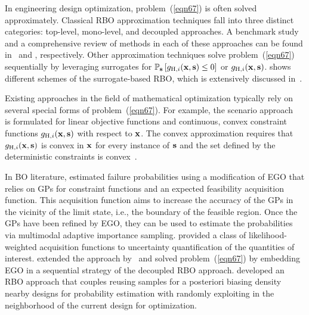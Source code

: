 \documentclass[journal ]{new-aiaa}
\begin{document}
	In engineering design optimization, problem~(\ref{eqn67}) is often solved approximately.
	Classical RBO approximation techniques fall into three distinct categories: top-level, mono-level, and decoupled approaches.
	A benchmark study and a comprehensive review of methods in each of these approaches can be found in~\citet{Aoues2010} and \citet{Valdebenito2010}, respectively.
	Other approximation techniques solve problem~(\ref{eqn67}) sequentially by leveraging surrogates for $\mathbb{P}_{\bf s}\left[g_{\text{H},i}({\bf x},{\bf s}) \leq 0\right]$ or $g_{\text{H},i}({\bf x},{\bf s})$.
	 shows different schemes of the surrogate-based RBO, which is extensively discussed in~\citet{Moustapha2019}.  
	
	Existing approaches in the field of mathematical optimization typically rely on several special forms of problem~(\ref{eqn67}).
	For example, the scenario approach~\citep{Calafiore2006} is formulated for linear objective functions and continuous, convex constraint functions $g_{\text{H},i}({\bf x},{\bf s})$ with respect to ${\bf x}$.
	The convex approximation requires that $g_{\text{H},i}({\bf x},{\bf s})$ is convex in ${\bf x}$ for every instance
	of ${\bf s}$ and the set defined by the deterministic constraints is convex~\citep{Nemirovski2012}.
	
	In BO literature, \citet{Bichon2008} estimated failure probabilities using a modification of EGO that relies on GPs for constraint functions and an expected feasibility acquisition function.
	This acquisition function aims to increase the accuracy of the GPs in the vicinity of the limit state, i.e., the boundary of the feasible region. 
	Once the GPs have been refined by EGO, they can be used to estimate the probabilities via multimodal adaptive importance sampling.
	\citet{Blanchard2021siamjuq} provided a class of likelihood-weighted acquisition functions to uncertainty quantification of the quantities of interest.
	\citet{Huynh2023} extended the approach by~\citet{Bichon2008} and solved problem~(\ref{eqn67}) by embedding EGO in a sequential strategy of the decoupled RBO approach.
	\citet{Chaudhuri2020} developed an RBO approach that couples reusing samples for a posteriori biasing density nearby designs for probability estimation with randomly exploiting in the neighborhood of the current design for optimization.
	
\end{document}
